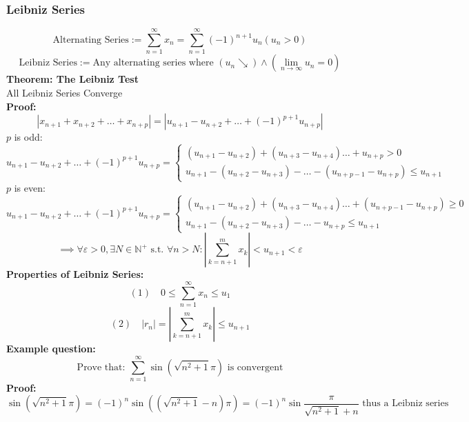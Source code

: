 \documentclass{article}
\newcommand{\0}{{\bf{0}}}
\begin{document}
\subsubsection{Leibniz Series}
$$\mbox{Alternating Series}:=\sum_{n=1}^\infty x_n=\sum_{n=1}^\infty (-1)^{n+1}u_n(u_n>0)$$
$$\mbox{Leibniz Series}:=\mbox{Any alternating series where }(u_n\searrow)\land(\lim_{n\to\infty}u_n=0)$$
\textbf{Theorem: The Leibniz Test}\\
All Leibniz Series Converge\\
\textbf{Proof:}
$$|x_{n+1}+x_{n+2}+\dots+x_{n+p}|=|u_{n+1}-u_{n+2}+\dots+(-1)^{p+1}u_{n+p}|$$
$p$ is odd:
$$u_{n+1}-u_{n+2}+\dots+(-1)^{p+1}u_{n+p}=
\begin{cases}
    (u_{n+1}-u_{n+2})+(u_{n+3}-u_{n+4})\dots+u_{n+p}>0\\
    u_{n+1}-(u_{n+2}-u_{n+3})-\dots-(u_{n+p-1}-u_{n+p})\le u_{n+1}
\end{cases}$$
$p$ is even:
$$u_{n+1}-u_{n+2}+\dots+(-1)^{p+1}u_{n+p}=
\begin{cases}
    (u_{n+1}-u_{n+2})+(u_{n+3}-u_{n+4})\dots+(u_{n+p-1}-u_{n+p})\geq0\\
    u_{n+1}-(u_{n+2}-u_{n+3})-\dots-u_{n+p}\le u_{n+1}
\end{cases}$$
$$\implies\forall\varepsilon>0,\exists N\in\mathbb{N}^+\mbox{ s.t. }\forall n>N:\left|\sum_{k=n+1}^mx_k\right|<u_{n+1}<\varepsilon$$
\textbf{Properties of Leibniz Series:}
$$(1)\quad0\le\sum_{n=1}^\infty x_n\le u_1$$
$$(2)\quad|r_n|=\left|\sum_{k=n+1}^mx_k\right|\le u_{n+1}$$
\textbf{Example question:}
$$\mbox{Prove that: }\sum_{n=1}^\infty\sin(\sqrt{n^2+1}\pi)\mbox{ is convergent}$$
\textbf{Proof:}
$$\sin(\sqrt{n^2+1}\pi)=(-1)^n\sin\left((\sqrt{n^2+1}-n)\pi\right)=(-1)^n\sin\frac{\pi}{\sqrt{n^2+1}+n}\mbox{ thus a Leibniz series}$$
\end{document}

